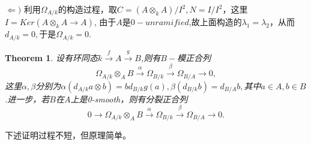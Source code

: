 \documentclass[UTF8]{article}
\newtheorem{thm}{Theorem}[section]
\begin{document}
$\Leftarrow )$
利用$\Omega_{A/k}$的构造过程，取$C=(A\otimes_{k}A)/I^{2},N=I/I^{2}$，这里$I=Ker(A\otimes_{k}A\rightarrow A)$,
由于$A$是$0-unramified $,故上面构造的$\lambda_{1}=\lambda_{2}$，从而$d_{A/k}=0,$于是$\Omega_{A/k}=0.$
\begin{thm}
	设有环同态$k\stackrel{f}{\rightarrow }A\stackrel{g}{\rightarrow}B$,则有$B-$模正合列
	$$
\Omega_{A/k}\otimes_{A}B\stackrel{\alpha}{\rightarrow}\Omega_{B/k}\stackrel{\beta}{\rightarrow}\Omega_{B/A}\rightarrow 0,
	$$
	这里$\alpha,\beta$分别为$\alpha(d_{A/k}a\otimes b)=bd_{B/k}g(a),\beta(d_{B/k}b)=d_{B/A}b,$其中$a\in A,b\in B$.进一步，若$B$在$A$上是0-smooth，则有分裂正合列
	$$
	0\rightarrow \Omega_{A/k}\otimes_{A}B\stackrel{\alpha}{\rightarrow}\Omega_{B/k}\stackrel{\beta}{\rightarrow}\Omega_{B/A}\rightarrow 0.
	$$
\end{thm}
下述证明过程不短，但原理简单。
\end{document}
